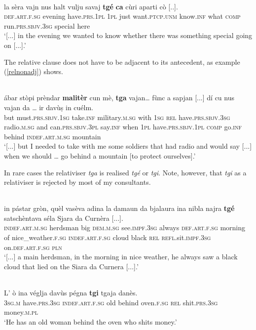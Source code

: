 \ea
\label{}
\\
\gll [...] la sèra vajn nus halt vulju savaj \textbf{tgé} \textbf{ca} cùri aparti cò [..].\\
{} \textsc{def.art.f.sg} evening have.\textsc{prs.1pl} \textsc{1pl} just want.\textsc{ptcp.unm} know.\textsc{inf} what \textsc{comp} run.\textsc{prs.sbjv.3sg} special here\\
\glt `[...] in the evening we wanted to know whether there was something special going on [...].'
\z

The relative clause does not have to be adjacent to its antecedent, as example (\ref{relnonadj}) shows.

\ea
\label{relnonadj}
\\
\gll  [...] ábar stòpi prèndar \textbf{malitèr} cun mè, \textbf{tga} vajan… fùnc a sapjan [...] dí cu nus vajan da … ir davùṣ in cuélm.\\
{} but must.\textsc{prs.sbjv.1sg} take.\textsc{inf} military.\textsc{m.sg} with \textsc{1sg} \textsc{rel} have.\textsc{prs.sbjv.3sg} radio.\textsc{m.sg} and can.\textsc{prs.sbjv.3pl} {} say.\textsc{inf} when \textsc{1pl} have.\textsc{prs.sbjv.1pl} \textsc{comp} {} go.\textsc{inf} behind \textsc{indef.art.m.sg} mountain\\
\glt `[...] but I needed to take with me some soldiers that had radio and would say [...] when we should … go behind a mountain [to protect ourselves].'
\z

In rare cases the relativiser \textit{tga} is realised \textit{tgé} or \textit{tgi}. Note, however, that \textit{tgi} as a relativiser is rejected by most of my consultants.

\ea
\label{}
\\
\gll [...] in pástar gròn, quèl vasèva adina la damaun da bjalaura ina nibla najra \textbf{tgé} satschèntava séla Sjara da Curnèra [...].\\
{} \textsc{indef.art.m.sg} herdsman big \textsc{dem.m.sg} see.\textsc{impf.3sg} always \textsc{def.art.f.sg} morning of nice\_weather.\textsc{f.sg} \textsc{indef.art.f.sg} cloud black \textsc{rel} \textsc{refl}.sit.\textsc{impf.3sg} on.\textsc{def.art.f.sg} \textsc{pln}\\
\glt `[...] a main herdsman, in the morning in nice weather, he always saw a black cloud that lied on the Siara da Curnera [...].'
\z

\ea
\label{}
\\
\gll L' ò ina véglja davùs pégna \textbf{tgi} tgaja danès.\\
\textsc{3sg.m} have.\textsc{prs.3sg} \textsc{indef.art.f.sg} old behind oven.\textsc{f.sg} \textsc{rel} shit.\textsc{prs.3sg} money.\textsc{m.pl}\\
\glt `He has an old woman behind the oven who shits money.'
\z

